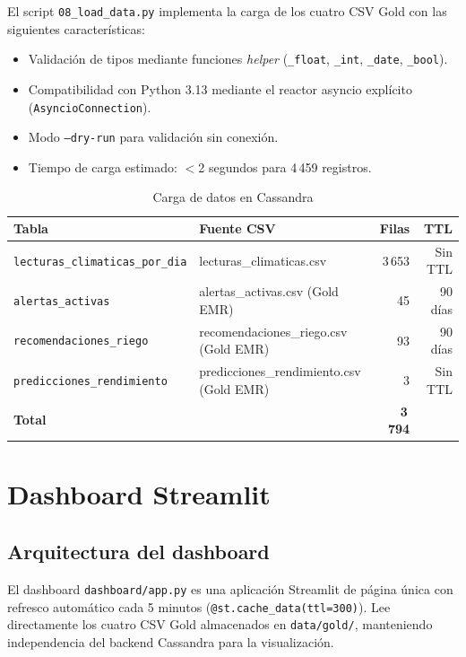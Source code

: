 \documentclass[12pt,a4paper]{article}
\begin{document}
El script \texttt{08\_load\_data.py} implementa la carga de los cuatro
CSV Gold con las siguientes características:

\begin{itemize}[noitemsep]
  \item Validación de tipos mediante funciones \textit{helper}
    (\texttt{\_float}, \texttt{\_int}, \texttt{\_date}, \texttt{\_bool}).
  \item Compatibilidad con Python 3.13 mediante el reactor asyncio
    explícito (\texttt{AsyncioConnection}).
  \item Modo \texttt{--dry-run} para validación sin conexión.
  \item Tiempo de carga estimado: $<$2 segundos para 4\,459 registros.
\end{itemize}

\begin{table}[H]
\centering
\caption{Carga de datos en Cassandra}
\label{tab:cassandra}
\begin{tabular}{llrr}
\toprule
\textbf{Tabla} & \textbf{Fuente CSV} & \textbf{Filas} & \textbf{TTL} \\
\midrule
\texttt{lecturas\_climaticas\_por\_dia} & lecturas\_climaticas.csv & 3\,653 & Sin TTL \\
\texttt{alertas\_activas}               & alertas\_activas.csv (Gold EMR)     &    45 & 90 días \\
\texttt{recomendaciones\_riego}         & recomendaciones\_riego.csv (Gold EMR) &  93 & 90 días \\
\texttt{predicciones\_rendimiento}      & predicciones\_rendimiento.csv (Gold EMR) & 3 & Sin TTL \\
\midrule
\textbf{Total} & & \textbf{3\,794} & \\
\bottomrule
\end{tabular}
\end{table}

\section{Dashboard Streamlit}

\subsection{Arquitectura del dashboard}

El dashboard \texttt{dashboard/app.py} es una aplicación Streamlit de
página única con refresco automático cada 5 minutos (\texttt{@st.cache\_data(ttl=300)}).
Lee directamente los cuatro CSV Gold almacenados en \texttt{data/gold/},
manteniendo independencia del backend Cassandra para la visualización.
\end{document}
